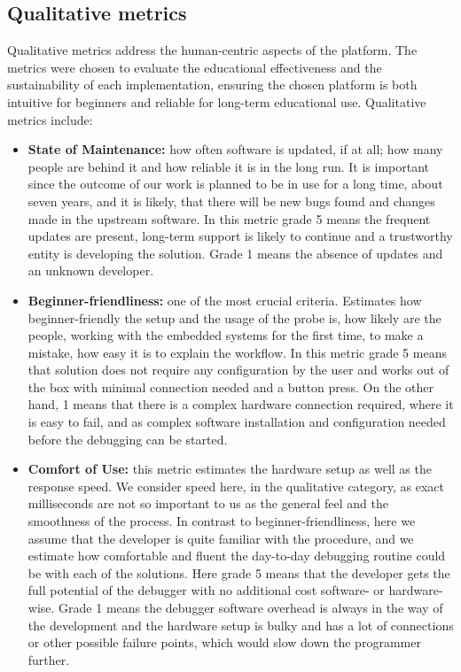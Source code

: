 \subsection{Qualitative metrics}

Qualitative metrics address the human-centric aspects of the platform. The metrics were chosen to evaluate the educational effectiveness and the sustainability of each implementation, ensuring the chosen platform is both intuitive for beginners and reliable for long-term educational use. Qualitative metrics include:

\begin{itemize}
    \item \textbf{State of Maintenance:} how often software is updated, if at all; how many people are behind it and how reliable it is in the long run. It is important since the outcome of our work is planned to be in use for a long time, about seven years, and it is likely, that there will be new bugs found and changes made in the upstream software. In this metric grade 5 means the frequent updates are present, long-term support is likely to continue and a trustworthy entity is developing the solution. Grade 1 means the absence of updates and an unknown developer. 

    \item \textbf{Beginner-friendliness:} one of the most crucial criteria. Estimates how beginner-friendly the setup and the usage of the probe is, how likely are the people, working with the embedded systems for the first time, to make a mistake, how easy it is to explain the workflow. In this metric grade 5 means that solution does not require any configuration by the user and works out of the box with minimal connection needed and a button press. On the other hand, 1 means that there is a complex hardware connection required, where it is easy to fail, and as complex software installation and configuration needed before the debugging can be started.

    \item \textbf{Comfort of Use:} this metric estimates the hardware setup as well as the response speed. We consider speed here, in the qualitative category, as exact milliseconds are not so important to us as the general feel and the smoothness of the process. In contrast to beginner-friendliness, here we assume that the developer is quite familiar with the procedure, and we estimate how comfortable and fluent the day-to-day debugging routine could be with each of the solutions. Here grade 5 means that the developer gets the full potential of the debugger with no additional cost software- or hardware-wise. Grade 1 means the debugger software overhead is always in the way of the development and the hardware setup is bulky and has a lot of connections or other possible failure points, which would slow down the programmer further. 

\end{itemize}

